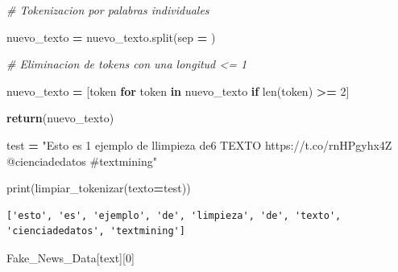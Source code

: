 \documentclass[
  11pt,
  a4paper,
]{article}
\newenvironment{Shaded}{\begin{snugshade}}{\end{snugshade}}
\newcommand{\BuiltInTok}[1]{#1}
\newcommand{\CommentTok}[1]{\textcolor[rgb]{0.56,0.35,0.01}{\textit{#1}}}
\newcommand{\ControlFlowTok}[1]{\textcolor[rgb]{0.13,0.29,0.53}{\textbf{#1}}}
\newcommand{\DecValTok}[1]{\textcolor[rgb]{0.00,0.00,0.81}{#1}}
\newcommand{\KeywordTok}[1]{\textcolor[rgb]{0.13,0.29,0.53}{\textbf{#1}}}
\newcommand{\NormalTok}[1]{#1}
\newcommand{\OperatorTok}[1]{\textcolor[rgb]{0.81,0.36,0.00}{\textbf{#1}}}
\newcommand{\StringTok}[1]{\textcolor[rgb]{0.31,0.60,0.02}{#1}}
\begin{document}
\begin{Shaded}
\begin{Highlighting}[]
    \CommentTok{\# Tokenizacion por palabras individuales}
    
\NormalTok{    nuevo\_texto }\OperatorTok{=}\NormalTok{ nuevo\_texto.split(sep }\OperatorTok{=} \StringTok{\textquotesingle{} \textquotesingle{}}\NormalTok{)}
    
    \CommentTok{\# Eliminacion de tokens con una longitud \textless{}= 1}
    
\NormalTok{    nuevo\_texto }\OperatorTok{=}\NormalTok{ [token }\ControlFlowTok{for}\NormalTok{ token }\KeywordTok{in}\NormalTok{ nuevo\_texto }\ControlFlowTok{if} \BuiltInTok{len}\NormalTok{(token) }\OperatorTok{\textgreater{}=}  \DecValTok{2}\NormalTok{]}
    
    \ControlFlowTok{return}\NormalTok{(nuevo\_texto)}
\end{Highlighting}
\end{Shaded}

\begin{Shaded}
\begin{Highlighting}[]

\NormalTok{test }\OperatorTok{=} \StringTok{"Esto es 1 ejemplo de l\textquotesingle{}limpieza de6 TEXTO  https://t.co/rnHPgyhx4Z @cienciadedatos \#textmining"}

\BuiltInTok{print}\NormalTok{(limpiar\_tokenizar(texto}\OperatorTok{=}\NormalTok{test))}
\end{Highlighting}
\end{Shaded}

\begin{verbatim}
['esto', 'es', 'ejemplo', 'de', 'limpieza', 'de', 'texto', 'cienciadedatos', 'textmining']
\end{verbatim}

\begin{Shaded}
\begin{Highlighting}[]
\NormalTok{Fake\_News\_Data[}\StringTok{\textquotesingle{}text\textquotesingle{}}\NormalTok{][}\DecValTok{0}\NormalTok{]}
\end{Highlighting}
\end{Shaded}
\end{document}
